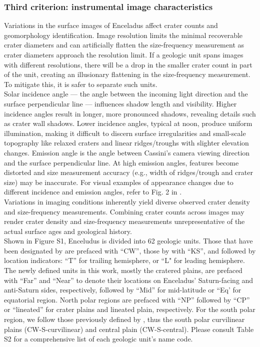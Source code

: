 \documentclass[preprint,12pt,3p,times,authoryear]{elsarticle}
\begin{document}
\subsubsection{Third criterion: instrumental image characteristics}
Variations in the surface images of Enceladus affect crater counts and geomorphology identification. Image resolution limits the minimal recoverable crater diameters and can artificially flatten the size-frequency measurement as crater diameters approach the resolution limit. If a geologic unit spans images with different resolutions, there will be a drop in the smaller crater count in part of the unit, creating an illusionary flattening in the size-frequency measurement. To mitigate this, it is safer to separate such units.\\

Solar incidence angle — the angle between the incoming light direction and the surface perpendicular line — influences shadow length and visibility. Higher incidence angles result in longer, more pronounced shadows, revealing details such as crater wall shadows.
Lower incidence angles, typical at noon, produce uniform illumination, making it difficult to discern surface irregularities and small-scale topography like relaxed craters and linear ridges/troughs with slighter elevation changes. Emission angle is the angle between Cassini's camera viewing direction and the surface perpendicular line. At high emission angles, features become distorted and size measurement accuracy (e.g., width of ridges/trough and crater size) may be inaccurate. For visual examples of appearance changes due to different incidence and emission angles, refer to Fig. 2 in \citet{Bland2018}.\\

Variations in imaging conditions inherently yield diverse observed crater density and size-frequency measurements. Combining crater counts across images may render crater density and size-frequency measurements unrepresentative of the actual surface ages and geological history.\\

Shown in Figure S1, Enceludus is divided into 62 geologic units. Those that have been designated by \citet{CrowWillard2015} are prefaced with ``CW'', those by \citet{Kirchoff2009} with ``KS'', and followed by location indicators: ``T'' for trailing hemisphere, or ``L" for leading hemisphere. The newly defined units in this work, mostly the cratered plains, are prefaced with ``Far'' and ``Near'' to denote their locations on Enceladus' Saturn-facing and anti-Saturn sides, respectively, followed by ``Mid'' for mid-latitude or ``Eq’ for equatorial region. North polar regions are prefaced with ``NP'' followed by ``CP'' or ``lineated'' for crater plains and lineated plain, respectively. For the south polar region, we follow those previously defined by \citet{CrowWillard2015}, thus the south polar curvilinear plains (CW-S-curvilinear) and central plain (CW-S-central). Please consult Table S2 for a comprehensive list of each geologic unit’s name code.\\
\end{document}
